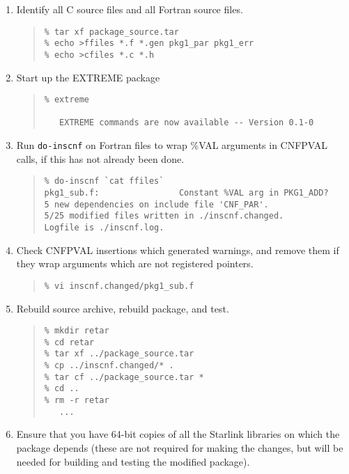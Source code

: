 \documentclass[twoside,11pt]{article}
\newcommand{\htmlref}[2]{#1}
\renewcommand{\_}{\texttt{\symbol{95}}}
\newcommand{\xdofilter}[1]{\htmlref{{\tt do-#1}}{do-xxx}}
\newenvironment{squote}{\begin{quote}\begin{small}}{\end{small}\end{quote}}
\begin{document}
\begin{enumerate}
%
\item
Identify all C source files and all Fortran source files.
\begin{squote}
\begin{verbatim}
% tar xf package_source.tar
% echo >ffiles *.f *.gen pkg1_par pkg1_err
% echo >cfiles *.c *.h
\end{verbatim}
\end{squote}
%
\item
Start up the EXTREME package
\begin{squote}
\begin{verbatim}
% extreme
 
   EXTREME commands are now available -- Version 0.1-0
\end{verbatim}
\end{squote}
%
\item
Run \xdofilter{inscnf} on Fortran files 
to wrap \%VAL arguments in CNF\_PVAL calls,
if this has not already been done.
\begin{squote}
\begin{verbatim}
% do-inscnf `cat ffiles`
pkg1_sub.f:                Constant %VAL arg in PKG1_ADD?
5 new dependencies on include file 'CNF_PAR'.
5/25 modified files written in ./inscnf.changed.
Logfile is ./inscnf.log.
\end{verbatim}
\end{squote}
%
\item
Check CNF\_PVAL insertions which generated warnings,
and remove them if they wrap arguments which are not registered pointers.
\begin{squote}
\begin{verbatim}
% vi inscnf.changed/pkg1_sub.f
\end{verbatim}
\end{squote}
%
\item
Rebuild source archive, rebuild package, and test.
\begin{squote}
\begin{verbatim}
% mkdir retar
% cd retar
% tar xf ../package_source.tar
% cp ../inscnf.changed/* .
% tar cf ../package_source.tar *
% cd ..
% rm -r retar
   ...
\end{verbatim}
\end{squote}
%
\item
Ensure that you have 64-bit copies of all the Starlink libraries on which the
package depends (these are not required for making the changes, but 
will be needed for building and testing the modified package).

\end{enumerate}
\end{document}
